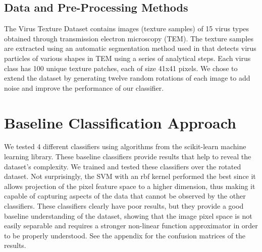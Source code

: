 \begin{multicols}{2}
\subsection{Data and Pre-Processing Methods}
\label{text:dataset}
The Virus Texture Dataset contains images (texture samples) of 15 virus types obtained through transmission electron microscopy (TEM). The texture samples are extracted using an automatic segmentation method used in \citet{JMI:JMI3556} that detects virus particles of various shapes in TEM using a series of analytical steps. Each virus class has 100 unique texture patches, each of size 41x41 pixels. We chose to extend the dataset by generating twelve random rotations of each image to add noise and improve the performance of our classifier. 


\section{Baseline Classification Approach}
We tested 4 different classifiers using algorithms from the scikit-learn \citet{scikit-learn} machine learning library. These baseline classifiers provide results that help to reveal the dataset's complexity. We trained and tested these classifiers over the rotated dataset. Not surprisingly, the SVM with an rbf kernel performed the best since it allows projection of the pixel feature space to a higher dimension, thus making it capable of capturing aspects of the data that cannot be observed by the other classifiers. These classifiers clearly have poor results, but they provide a good baseline understanding of the dataset, showing that the image pixel space is not easily separable and requires a stronger non-linear function approximator in order to be properly understood. See the appendix for the confusion matrices of the results.


\begin{table}
\end{table}



\end{multicols}
